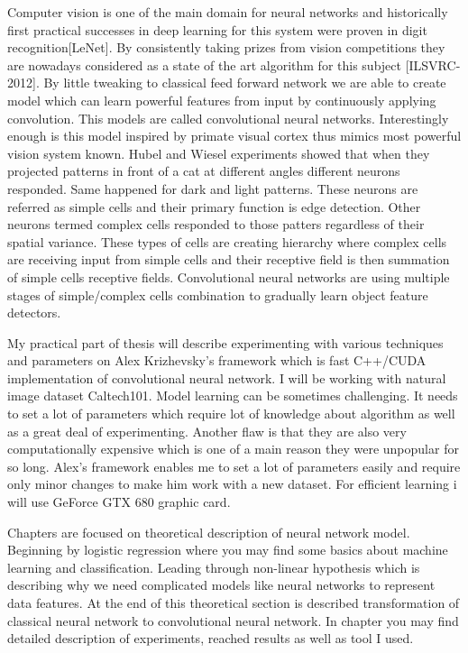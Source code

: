 Computer vision is one of the main domain for neural networks and historically first practical successes in deep learning for this system were proven in digit recognition[LeNet]. By consistently taking prizes from vision competitions they are nowadays considered as a state of the art algorithm for this subject [ILSVRC-2012]. By little tweaking to classical feed forward network we are able to create  model which can learn powerful features from input by continuously applying convolution. This models are called convolutional neural networks. Interestingly enough is this model inspired by primate visual cortex thus mimics most powerful vision system known. Hubel and Wiesel experiments showed that when they projected patterns in front of a cat at different angles different neurons responded. Same happened for dark and light patterns. These neurons are referred as simple cells and their primary function is edge detection. Other neurons termed complex cells responded to those patters regardless of their spatial variance. These types of cells are creating hierarchy where complex cells are receiving input from simple cells and their receptive field is then summation of simple cells receptive fields. Convolutional neural networks are using multiple stages of simple/complex cells combination to gradually learn object feature detectors.

My practical part of thesis will describe experimenting with various techniques and parameters on Alex Krizhevsky's framework which is fast C++/CUDA implementation of convolutional neural network. I will be working with natural image dataset Caltech101. Model learning can be sometimes challenging. It needs to set a lot of parameters which require lot of knowledge about algorithm as well as a great deal of experimenting. Another flaw is that they are also very computationally expensive which is one of a main reason they were unpopular for so long. Alex's framework enables me to set a lot of parameters easily and require only minor changes to make him work with a new dataset. For efficient learning i will use GeForce GTX 680 graphic card. 

Chapters are focused on theoretical description of neural network model. Beginning by logistic regression where you may find some basics about machine learning and classification. Leading through non-linear hypothesis which is describing why we need complicated models like neural networks to represent data features. At the end of this theoretical section is described transformation of classical neural network to convolutional neural network. In chapter you may find detailed description of experiments, reached results as well as tool I used. 

